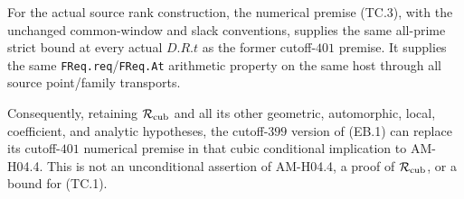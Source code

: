 \begin{theorem}
\label{AC-K35}
For the actual source rank construction, the numerical premise
(TC.3), with the unchanged common-window and slack conventions,
supplies the same all-prime strict bound at every actual $D.R.t$
as the former cutoff-$401$ premise.  It supplies the same
\texttt{FReq.req}/\texttt{FReq.At} arithmetic property on the same
host through all source point/family transports.

Consequently, retaining $\mathcal R_{\rm cub}$ and all its other
geometric, automorphic, local, coefficient, and analytic hypotheses,
the cutoff-$399$ version of (EB.1) can replace its cutoff-$401$
numerical premise in that cubic conditional implication to AM-H04.4.
This is not an unconditional assertion of AM-H04.4, a proof of
$\mathcal R_{\rm cub}$, or a bound for (TC.1).
\end{theorem}

